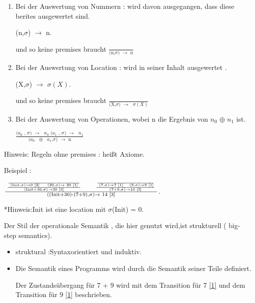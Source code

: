 \documentclass[a4paper,12pt,twoside,headsepline]{scrartcl}
\begin{document}
\begin{enumerate}

\item Bei der Auswertung von Nummern : wird davon ausgegangen, dass diese berites ausgewertet sind.\label{1}
\begin{center}
(n,$\sigma$) $\to$ n.    

 und so keine premises braucht   $\frac{ } {\text{(n,$\sigma$) $\to$ n}}$
\end{center}  
\item Bei der Auswertung von Location : wird in seiner Inhalt ausgewertet .\label{2}

\begin{center}
	(X,$\sigma$) $\to$ $\sigma(X)$.    
	
	und so keine premises braucht    $\frac{ } {\text{(X,$\sigma$) $\to$ $\sigma(X)$}}$
\end{center} 

\item \label{3} Bei der Auswertung von Operationen, wobei n die Ergebnis von $n_0$ $\oplus$ $n_1$ ist.

\begin{center}
	 $\frac  {\text {($a_0$ , $\sigma$) $\to$ $n_0$   ($a_1$ , $\sigma$) $\to$ $n_1$} } { \text{($a_0$ $\oplus$ $a_1$,$\sigma$) $\to$ n} }$ 
\end{center}


\end{enumerate}   
Hinweis: Regeln ohne premises : heißt Axiome. 



Beispiel : 
\begin{center} \fontsize{18}{15}
	
	$\frac{  \text{  $\frac { \text {$\frac  {}  {\text{ (Init,$\sigma$)$\to$0 $\ref{2}$ $\quad$          (30,$\sigma$)$\to$ 30 $\ref{1}$ }}$}   } {\text{(Init+30,$\sigma$)$\to$30  $\ref{3}$}}$ $\qquad$   $\frac { \text {$\frac  {}  {\text{ (7,$\sigma$)$\to$7 $ $\ref{1}$\quad$           (9,$\sigma$)$\to$9 $\ref{1}$}}$}} {\text{(7+9,$\sigma$)$\to$16 $\ref{3}$}}$  }} {\text{((Init+30)-(7+9),$\sigma$)$\to$ 14 $\ref{3}$}}$.
	
	
	
	*Hinweis:Init ist eine location mit $\sigma$(Init) = 0. 
\end{center}

Der Stil der operationale  Semantik , die hier genutzt wird,ist strukturell ( big-step semantics).
\begin{itemize}
\item struktural :Syntaxorientiert und induktiv.
\item Die Semantik eines Programms wird durch  die Semantik seiner Teile definiert.


Der Zustandsübergang für 7 + 9 wird mit dem Transition für 7 \ref{1} und dem Transition für 9 \ref {1} beschrieben.
\end{itemize}
              
\end{document}
